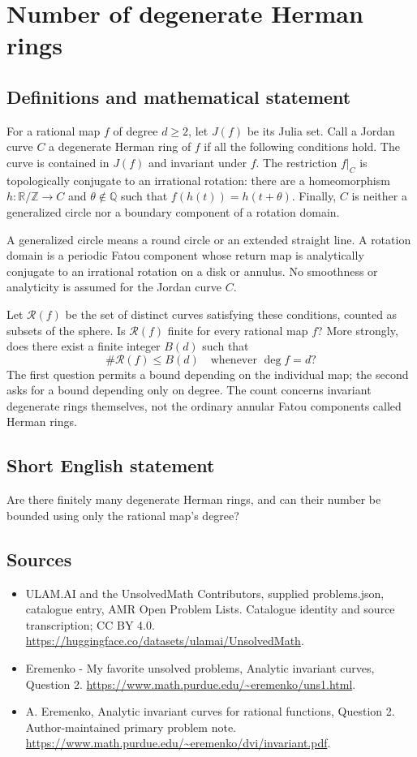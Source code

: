 \documentclass[11pt,a4paper]{article}
\begin{document}
\section*{Number of degenerate Herman rings}\label{statement}

\subsection{Definitions and mathematical statement}
For a rational map $f$ of degree $d\geq2$, let $J(f)$
be its Julia set. Call a Jordan curve $C$ a degenerate
Herman ring of $f$ if all the following conditions hold.
The curve is contained in $J(f)$ and invariant under $f$.
The restriction $f|_C$ is topologically conjugate to an
irrational rotation: there are a homeomorphism
$h:\mathbb R/\mathbb Z\to C$ and $\theta\notin\mathbb Q$
such that $f(h(t))=h(t+\theta)$.
Finally, $C$ is neither a generalized circle nor a boundary
component of a rotation domain.

A generalized circle means a round circle or an extended
straight line. A rotation domain is a periodic Fatou component
whose return map is analytically conjugate to an irrational
rotation on a disk or annulus. No smoothness or analyticity
is assumed for the Jordan curve $C$.

Let $\mathcal R(f)$ be the set of distinct curves satisfying
these conditions, counted as subsets of the sphere.
Is $\mathcal R(f)$ finite for every rational map $f$?
More strongly, does there exist a finite integer $B(d)$ such
that
\[
                    \#\mathcal R(f)\leq B(d)
             \quad\text{whenever }\deg f=d?
\]
The first question permits a bound depending on the individual
map; the second asks for a bound depending only on degree.
The count concerns invariant degenerate rings themselves,
not the ordinary annular Fatou components called Herman rings.
\subsection{Short English statement}
Are there finitely many degenerate Herman rings, and can their number be bounded using only the rational map's degree?
\subsection{Sources}
\begin{itemize}
\item[S1] ULAM.AI and the UnsolvedMath Contributors, supplied problems.json, catalogue entry, AMR Open Problem Lists. Catalogue identity and source transcription; CC BY 4.0.
\url{https://huggingface.co/datasets/ulamai/UnsolvedMath}.
\item[S2] Eremenko - My favorite unsolved problems, Analytic invariant curves, Question 2. 
\url{https://www.math.purdue.edu/~eremenko/uns1.html}.
\item[S3] A. Eremenko, Analytic invariant curves for rational functions, Question 2. Author-maintained primary problem note.
\url{https://www.math.purdue.edu/~eremenko/dvi/invariant.pdf}.
\end{itemize}
\end{document}
